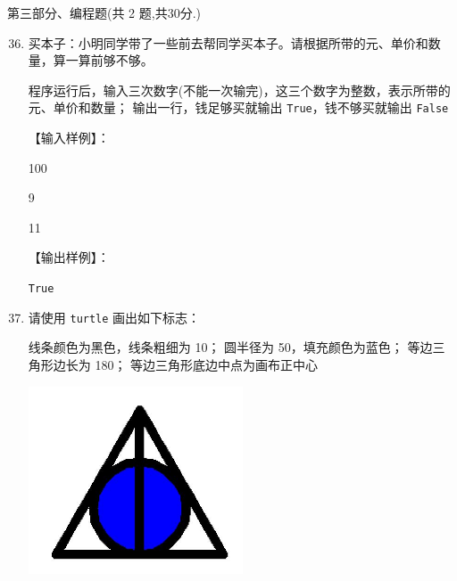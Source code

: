 \documentclass[11pt]{ctexart}
\begin{document}
    \newpage
    {\noindent\heiti 第三部分、编程题(共 2 题,共30分.)}
    \begin{enumerate}
        \setcounter{enumi}{35}
        
        \item 买本子：小明同学带了一些前去帮同学买本子。请根据所带的元、单价和数量，算一算前够不够。
        
        \begin{tasks}[label=(\arabic*)]
            \task 程序运行后，输入三次数字(不能一次输完)，这三个数字为整数，表示所带的元、单价和数量；
            \task 输出一行，钱足够买就输出 \lstinline{True}，钱不够买就输出 \lstinline{False}
        \end{tasks}

        【输入样例】：

        100

        9

        11

        【输出样例】：
       
        \lstinline{True}
        \vfill

        \item 请使用 \lstinline{turtle} 画出如下标志：
        
        \begin{minipage}{.55\textwidth}
            \begin{tasks}[label=(\arabic*)]
                \task 线条颜色为黑色，线条粗细为 10；
                \task 圆半径为 50，填充颜色为蓝色；
                \task 等边三角形边长为 180；
                \task 等边三角形底边中点为画布正中心
            \end{tasks}
        \end{minipage}
        \begin{minipage}{.35\textwidth}
            \centering
            \includegraphics[width=0.5\textwidth]{37.jpg}
        \end{minipage}
        \vfill
    \end{enumerate}
\end{document}
